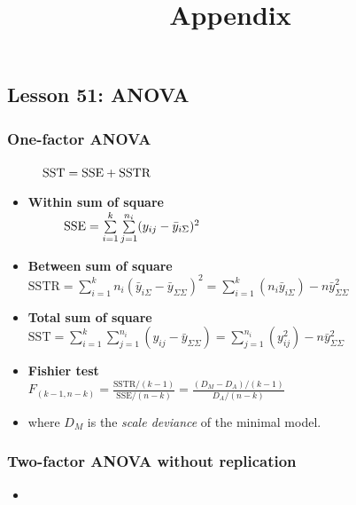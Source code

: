 \documentclass[10pt, french]{article}
\begin{document}
\begin{multicols*}{3}
\section*{Lesson 51: ANOVA}
\subsubsection*{One-factor ANOVA}
$\hspace*{1cm} \mathrm{SST} = \mathrm{SSE} + \mathrm{SSTR}$
\begin{itemize}[align=left,leftmargin=*]
   \item  \textbf{Within sum of square} \\
   $\hspace*{1cm} \mathrm{SSE} = \sum\limits_{i=1}^k \sum\limits_{j=1}^{n_i} (y_{ij} - \bar{y}_{i\Sigma})^2$
   \item \textbf{Between sum of square} \\
   $\mathrm{SSTR} = \sum\limits_{i=1}^k n_i (\bar{y}_{i\Sigma} - \bar{y}_{\Sigma\Sigma})^2 = \sum\limits_{i=1}^k (n_i \bar{y}_{i\Sigma}) - n\bar{y}_{\Sigma\Sigma}^2$
   \item \textbf{Total sum of square} \\
   $\mathrm{SST} = \sum\limits_{i=1}^k \sum\limits_{j=1}^{n_i} (y_{ij} - \bar{y}_{\Sigma\Sigma}) = \sum\limits_{j=1}^{n_i} (y_{ij}^2) - n\bar{y}_{\Sigma\Sigma}^2$ \\
   \item \textbf{Fishier test} \\
   $F_{(k-1, n-k)} = \frac{\mathrm{SSTR}/(k-1)}{\mathrm{SSE}/(n-k)} = \frac{(D_M - D_A)/(k-1)}{D_A/(n-k)}$
   \item[] where $D_M$ is the \emph{scale deviance} of the minimal model.
\end{itemize}
\subsubsection*{Two-factor ANOVA without replication}
\begin{itemize}
  \item   
\end{itemize}






 \newpage
\title{Appendix}
\date{}
\author{}
\maketitle
\vspace{-70pt}
\def\SectionColor{black!80!white}

\end{multicols*}
\end{document}
